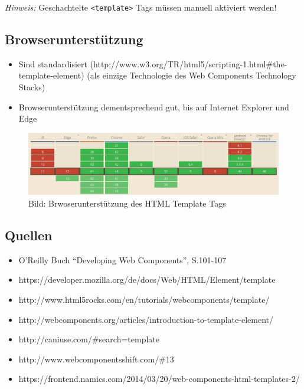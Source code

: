 \emph{Hinweis:} Geschachtelte \texttt{\textless{}template\textgreater{}}
Tags müssen manuell aktiviert werden!

\subsection{Browserunterstützung}\label{browserunterstuxfctzung}

\begin{itemize}
\tightlist
\item
  Sind standardisiert
  (http://www.w3.org/TR/html5/scripting-1.html\#the-template-element)
  (als einzige Technologie des Web Components Technology Stacks)
\item
  Browserunterstützung dementsprechend gut, bis auf Internet Explorer
  und Edge
\end{itemize}

\begin{figure}[htbp]
\centering
\includegraphics{images/3-html-templates-browserunterstuetzung.jpg}
\caption{Bild: Brwoserunterstützung des HTML Template Tags}
\end{figure}

\subsection{Quellen}\label{quellen}

\begin{itemize}
\tightlist
\item
  O'Reilly Buch ``Developing Web Components'', S.101-107
\item
  https://developer.mozilla.org/de/docs/Web/HTML/Element/template
\item
  http://www.html5rocks.com/en/tutorials/webcomponents/template/
\item
  http://webcomponents.org/articles/introduction-to-template-element/
\item
  http://caniuse.com/\#search=template
\item
  http://www.webcomponentsshift.com/\#13
\item
  https://frontend.namics.com/2014/03/20/web-components-html-templates-2/
\end{itemize}
